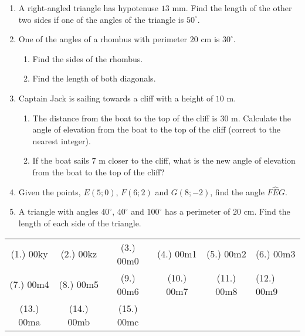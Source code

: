\begin{eocexercises}{}
\begin{enumerate}[itemsep=6pt, label=\textbf{\arabic*}. ]
\item A right-angled triangle has hypotenuse $13$ mm. Find the length of the other two sides if one of the angles of the triangle is $50^{\circ}$.
\item One of the angles of a rhombus with perimeter $20$ cm is $30^{\circ}$. 
\begin{enumerate}[noitemsep, label=\textbf{(\alph*)} ]
\item Find the sides of the rhombus. 
\item Find the length of both diagonals. 
\end{enumerate} 
\item Captain Jack is sailing towards a cliff with a height of $10$ m. 
\begin{enumerate}[noitemsep, label=\textbf{(\alph*)} ] 
\item The distance from the boat to the top of the cliff is $30$ m. Calculate the angle of elevation from the boat to the top of the cliff (correct to the nearest integer).
\item If the boat sails $7$ m closer to the cliff, what is the new angle of elevation from the boat to the top of the cliff? 
\end{enumerate} 
\item Given the points, $E(5;0)$, $F(6;2)$ and $G(8;-2)$, find the angle $F\hat{E}G$. 
\item  A triangle with angles $40^{\circ}$, $40^{\circ}$ and $100^{\circ}$ has a perimeter of $20$ cm. Find the length of each side of the triangle. 

\end{enumerate}
\par \practiceinfo
\par \begin{tabular}[h]{ccccc}
(1.)	00ky	&
(2.)	00kz	&
(3.)	00m0	&
(4.)	00m1	&
(5.)	00m2	&
(6.)	00m3	\\ %
(7.)	00m4	&
(8.)	00m5	&
(9.)	00m6	&
(10.)	00m7	&
(11.)	00m8	&
(12.)	00m9	\\ %
(13.)	00ma	&
(14.)	00mb	&
(15.)	00mc	&
\end{tabular}
\end{eocexercises}
